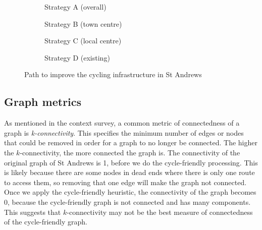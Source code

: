 \documentclass[12pt,a4paper]{report}
\begin{document}
\begin{figure}[ht]
    \centering
    \begin{subfigure}[ht]{0.47\textwidth}
        \centering
        
        \caption{Strategy A (overall)}
        \label{fig:overall st andrews}
    \end{subfigure}
    \hfill
    \begin{subfigure}[ht]{0.47\textwidth}
        \centering
        
        \caption{Strategy B (town centre)}
        \label{fig:centre st andrews}
    \end{subfigure}
    \hfill
    \begin{subfigure}[ht]{0.47\textwidth}
        \centering
        
        \caption{Strategy C (local centre)}
        \label{fig:local st andrews}
    \end{subfigure}
    \hfill
    \begin{subfigure}[ht]{0.47\textwidth}
        \centering
        
        \caption{Strategy D (existing)}
        \label{fig:existing st andrews}
    \end{subfigure}
       \caption{Path to improve the cycling infrastructure in St Andrews}
       \label{fig:path st andrews}
\end{figure}

\subsection{Graph metrics}\label{sec:metrics}
As mentioned in the context survey, a common metric of connectedness of a graph is \textit{k-connectivity}. This specifies the minimum number of edges or nodes that could be removed in order for a graph to no longer be connected. The higher the $k$-connectivity, the more connected the graph is. The connectivity of the original graph of St Andrews is 1, before we do the cycle-friendly processing. This is likely because there are some nodes in dead ends where there is only one route to access them, so removing that one edge will make the graph not connected. Once we apply the cycle-friendly heuristic, the connectivity of the graph becomes 0, because the cycle-friendly graph is not connected and has many components. This suggests that $k$-connectivity may not be the best measure of connectedness of the cycle-friendly graph.
\end{document}
